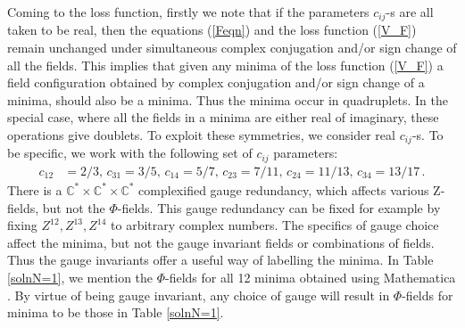 \documentclass[12pt,a4paper]{JHEP3}
\newcommand{\refb}[1]{(\ref{#1})}
\begin{document}
Coming to the loss function, firstly we note that if the parameters $c_{ij}$-s are all taken to be real, then the equations \refb{Feqn} and the loss function \refb{V_F} remain unchanged under simultaneous complex conjugation and/or sign change of all the fields. This implies that given any minima of the loss function \refb{V_F} a field configuration obtained by complex conjugation and/or sign change of a minima, should also be a minima. Thus the minima occur in quadruplets. In the special case, where all the fields in a minima are either real of imaginary, these operations give doublets. To exploit these symmetries, we consider real $c_{ij}$-s. To be specific, we work with the following set  of $c_{ij}$ parameters:
\begin{align}
c_{12} &= 2/3, \, c_{31} = 3/5, \, c_{14} = 5/7, \, c_{23} = 7/11, \, c_{24} = 11/13, \, c_{34} = 13/17 \, . \label{c}
\end{align}
There is a $\mathbb{C}^\ast \times \mathbb{C}^\ast \times \mathbb{C}^\ast$ complexified gauge redundancy, which affects various Z-fields, but not the $\Phi$-fields. This gauge redundancy can be fixed for example by fixing $Z^{12}, Z^{13}, Z^{14}$ to arbitrary complex numbers. The specifics of gauge choice affect the minima, but not the gauge invariant fields or combinations of fields. Thus the gauge invariants offer a useful way of labelling the  minima.  In Table \ref{solnN=1}, we  mention the $\Phi$-fields  for all 12 minima obtained using Mathematica \cite{Mathematica}. By virtue of being  gauge invariant, any choice of gauge will result in $\Phi$-fields for minima to be those in Table \ref{solnN=1}.
%
\end{document}
